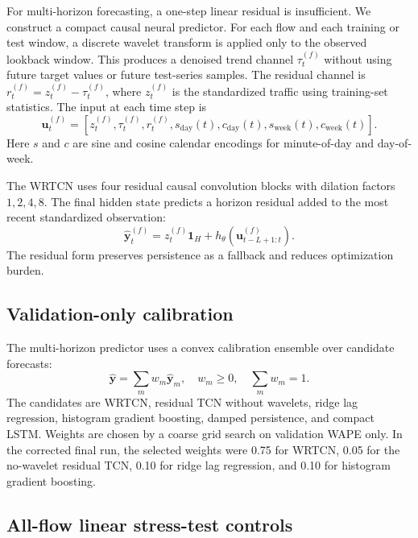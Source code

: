 \documentclass{article}
\begin{document}
For multi-horizon forecasting, a one-step linear residual is insufficient. We construct a compact causal neural predictor. For each flow and each training or test window, a discrete wavelet transform is applied only to the observed lookback window. This produces a denoised trend channel $\tau_t^{(f)}$ without using future target values or future test-series samples. The residual channel is $r_t^{(f)}=z_t^{(f)}-\tau_t^{(f)}$, where $z_t^{(f)}$ is the standardized traffic using training-set statistics. The input at each time step is
\begin{equation}
  \mathbf{u}_t^{(f)} =
  [z_t^{(f)}, \tau_t^{(f)}, r_t^{(f)}, s_{\mathrm{day}}(t), c_{\mathrm{day}}(t),
  s_{\mathrm{week}}(t), c_{\mathrm{week}}(t)].
\end{equation}
Here $s$ and $c$ are sine and cosine calendar encodings for minute-of-day and day-of-week.

The WRTCN uses four residual causal convolution blocks with dilation factors $1,2,4,8$. The final hidden state predicts a horizon residual added to the most recent standardized observation:
\begin{equation}
  \hat{\mathbf{y}}_t^{(f)}
  =
  z_t^{(f)}\mathbf{1}_H + h_\theta(\mathbf{u}_{t-L+1:t}^{(f)}).
  \label{eq:wrtcn}
\end{equation}
The residual form preserves persistence as a fallback and reduces optimization burden.

\subsection{Validation-only calibration}

The multi-horizon predictor uses a convex calibration ensemble over candidate forecasts:
\begin{equation}
  \hat{\mathbf{y}} =
  \sum_m w_m \hat{\mathbf{y}}_m,\quad
  w_m\geq 0,\quad \sum_m w_m=1.
\end{equation}
The candidates are WRTCN, residual TCN without wavelets, ridge lag regression, histogram gradient boosting, damped persistence, and compact LSTM. Weights are chosen by a coarse grid search on validation WAPE only. In the corrected final run, the selected weights were 0.75 for WRTCN, 0.05 for the no-wavelet residual TCN, 0.10 for ridge lag regression, and 0.10 for histogram gradient boosting.

\subsection{All-flow linear stress-test controls}
\end{document}
